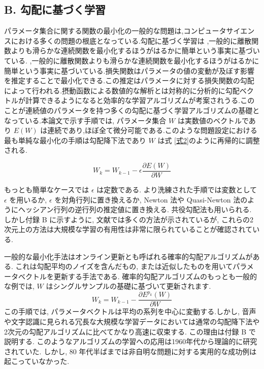 \documentclass[twocolumn]{jarticle}     %
\begin{document}
\subsection*{B. 勾配に基づく学習}
パラメータ集合に関する関数の最小化の一般的な問題は,コンピュータサイエンスにおける多くの問題の根底となっている.勾配に基づく学習は
,一般的に離散関数よりも滑らかな連続関数を最小化するほうがはるかに簡単という事実に基づいている.
,一般的に離散関数よりも滑らかな連続関数を最小化するほうがはるかに簡単という事実に基づいている.損失関数はパラメータの値の変動が及ぼす影響を推定することで最小化できる.この推定はパラメータに対する損失関数の勾配によって行われる.摂動函数による数値的な解析とは対称的に分析的に勾配ベクトルが計算できるようになると効率的な学習アルゴリズムが考案されうる.このことが連続値のパラメータを持つ多くの勾配に基づく学習アルゴリズムの基礎となっている.本論文で示す手順では,
パラメータ集合 $W$ は実数値のベクトルであり $E(W)$ は連続であり,ほぼ全て微分可能である.このような問題設定における最も単純な最小化の手順は勾配降下法であり $W$ は式 \ref{式2}のように再帰的に調整される.

\begin{equation}
  \label{式2}
  W_{k} = W_{k-1} - \epsilon \frac{\partial E(W)}{\partial W}
\end{equation}

もっとも簡単なケースでは $\epsilon$ は定数である. より洗練された手順では変数として $\epsilon$ を用いるか, $\epsilon$ を対角行列に置き換えるか, Newton 法や Quasi-Newton 法のようにヘッシアン行列の逆行列の推定値に置き換える. 共役勾配法も用いられる.
しかし付録 B に示すように, 文献では多くの方法が示されているが, これらの2次元上の方法は大規模な学習の有用性は非常に限られていることが確認されている.
\par
一般的な最小化手法はオンライン更新とも呼ばれる確率的勾配アルゴリズムがある.
これは勾配平均のノイズを含んだもの, または近似したものを用いてパラメータベクトルを更新する手法である. 確率的勾配アルゴリズムのもっとも一般的な例では, $W$ はシングルサンプルの基礎に基づいて更新されます.
\begin{equation}
  \label{式3}
  W_{k} = W_{k-1} - \frac{\partial E^{p_k}(W)}{\partial W}
\end{equation}
この手順では, パラメータベクトルは平均の系列を中心に変動する.しかし, 音声や文字認識に見られる冗長な大規模な学習データにおいては通常の勾配降下法や2次元の勾配アルゴリズムに比べてかなり高速に収束する. 
この理由は付録 B で説明する.
このようなアルゴリズムの学習への応用は1960年代から理論的に研究されていた. しかし, 80 年代半ばまでは非自明な問題に対する実用的な成功例は起こっていなかった.
\end{document}
